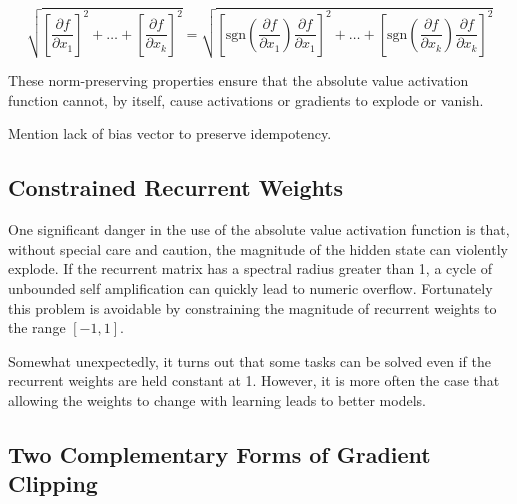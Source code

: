 \documentclass{article}
\begin{document}
\begin{itemize}
\begin{equation}
\sqrt{{ \left [ \frac{\partial f}{\partial x_1} \right ] }^{2} + \dots + { \left [ \frac{\partial f}{\partial x_k} \right ] }^{2}} = 
\sqrt{{\left [ \textrm{sgn} \left ( \frac{\partial f}{\partial x_1} \right ) \frac{\partial f}{\partial x_1} \right ] }^{2} + \dots + {\left [ \textrm{sgn} \left ( \frac{\partial f}{\partial x_k} \right ) \frac{\partial f}{\partial x_k} \right ] }^{2}}
\end{equation}

\end{itemize}

These norm-preserving properties ensure that the absolute value activation function cannot, by itself, cause activations or gradients to explode or vanish.

Mention lack of bias vector to preserve idempotency.


\subsection{Constrained Recurrent Weights}

One significant danger in the use of the absolute value activation function is that, without special care and caution, the magnitude of the hidden state can violently explode. If the recurrent matrix has a spectral radius greater than 1, a cycle of unbounded self amplification can quickly lead to numeric overflow. Fortunately this problem is avoidable by constraining the magnitude of recurrent weights to the range $\left [-1, 1 \right ]$.

Somewhat unexpectedly, it turns out that some tasks can be solved even if the recurrent weights are held constant at 1. However, it is more often the case that allowing the weights to change with learning leads to better models.



\subsection{Two Complementary Forms of Gradient Clipping}
\end{document}
